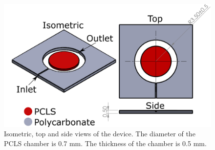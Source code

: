 \documentclass[11pt]{article}
\begin{document}
\begin{figure}
\centering
\includegraphics[width=.8\linewidth,keepaspectratio=true]{./device/tisumr-device.png}
\caption{Isometric, top and side views of the device. The diameter of the PCLS chamber is 0.7 mm. The thickness of the chamber is 0.5 mm.}
\label{fig:tisumr-device}
\end{figure}
\end{document}
